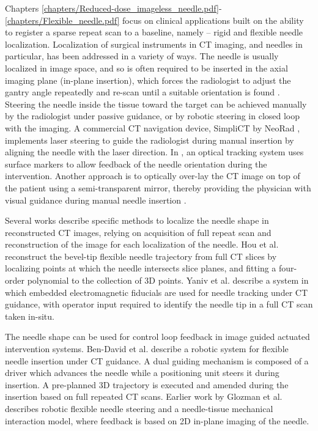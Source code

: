 Chapters \ref{chapters/Reduced-dose_imageless_needle.pdf}-\ref{chapters/Flexible_needle.pdf} focus on clinical applications built on the ability to register a sparse repeat scan to a baseline, namely -- rigid and flexible needle localization. Localization of surgical instruments in CT imaging, and needles in particular, has been addressed in a variety of ways. The needle is usually localized in image space, and so is often required to be inserted in the axial imaging plane (in-plane insertion), which forces the radiologist to adjust the gantry angle repeatedly and re-scan until a suitable orientation is found \cite{walsh2011smaller}. Steering the needle inside the tissue toward the target can be achieved manually by the radiologist under passive guidance, or by robotic steering in closed loop with the imaging. A commercial CT navigation device, SimpliCT by NeoRad \cite{simpliCT}, implements laser steering to guide the radiologist during manual insertion by aligning the needle with the laser direction. In \cite{schubert2013ct}, an optical tracking system uses surface markers to allow feedback of the needle orientation during the intervention. Another approach is to optically over-lay the CT image on top of the patient using a semi-transparent mirror, thereby providing the physician with visual guidance during manual needle insertion \cite{fichtinger2005image}.

Several works describe specific methods to localize the needle shape in reconstructed CT images, relying on acquisition of full repeat scan and reconstruction of the image for each localization of the needle.
Hou et al. \cite{huo2015shape} reconstruct the bevel-tip flexible needle trajectory from full CT slices by localizing points at which the needle intersects slice planes, and fitting a four-order polynomial to the collection of 3D points.
Yaniv et al. \cite{yaniv2010needle} describe a system in which embedded electromagnetic fiducials are used for needle tracking under CT guidance, with operator input required to identify the needle tip in a full CT scan taken in-situ.

The needle shape can be used for control loop feedback in image guided actuated intervention systems.
Ben-David et al. \cite{ben2018evaluation} describe a robotic system for flexible needle insertion under CT guidance. A dual guiding mechanism is composed of a driver which advances the needle while a positioning unit steers it during insertion. A pre-planned 3D trajectory is executed and amended during the insertion based on full repeated CT scans. Earlier work by Glozman et al. \cite{glozman2007image} describes robotic flexible needle steering and a needle-tissue mechanical interaction model, where feedback is based on 2D in-plane imaging of the needle.

